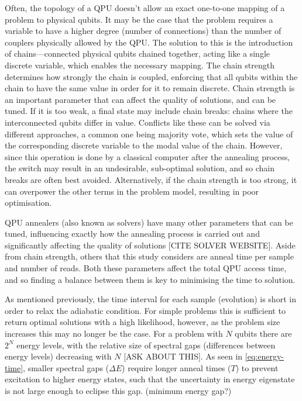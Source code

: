 \documentclass[12pt]{article}
\theoremstyle{definition}
\begin{document}
Often, the topology of a QPU doesn't allow an exact one-to-one mapping of a problem to physical qubits. It may be the case that the problem requires a variable to have a higher degree (number of connections) than the number of couplers physically allowed by the QPU. The solution to this is the introduction of chains---connected physical qubits chained together, acting like a single discrete variable, which enables the necessary mapping. The chain strength determines how strongly the chain is coupled, enforcing that all qubits within the chain to have the same value in order for it to remain discrete. Chain strength is an important parameter that can affect the quality of solutions, and can be tuned. If it is too weak, a final state may include chain breaks: chains where the interconnected qubits differ in value. Conflicts like these can be solved via different approaches, a common one being majority vote, which sets the value of the corresponding discrete variable to the modal value of the chain. However, since this operation is done by a classical computer after the annealing process, the switch may result in an undesirable, sub-optimal solution, and so chain breaks are often best avoided. Alternatively, if the chain strength is too strong, it can overpower the other terms in the problem model, resulting in poor optimisation.

QPU annealers (also known as solvers) have many other parameters that can be tuned, influencing exactly how the annealing process is carried out and significantly affecting the quality of solutions [CITE SOLVER WEBSITE]. Aside from chain strength, others that this study considers are anneal time per sample and number of reads. Both these parameters affect the total QPU access time, and so finding a balance between them is key to minimising the time to solution.

As mentioned previously, the time interval for each sample (evolution) is short in order to relax the adiabatic condition. For simple problems this is sufficient to return optimal solutions with a high likelihood, however, as the problem size increases this may no longer be the case. For a problem with $N$ qubits there are $2^N$ energy levels, with the relative size of spectral gaps (differences between energy levels) decreasing with $N$ [ASK ABOUT THIS]. As seen in \cref{eq:energy-time}, smaller spectral gaps ($\Delta E$) require longer anneal times ($T$) to prevent excitation to higher energy states, such that the uncertainty in energy eigenstate is not large enough to eclipse this gap. (minimum energy gap?)
\end{document}
